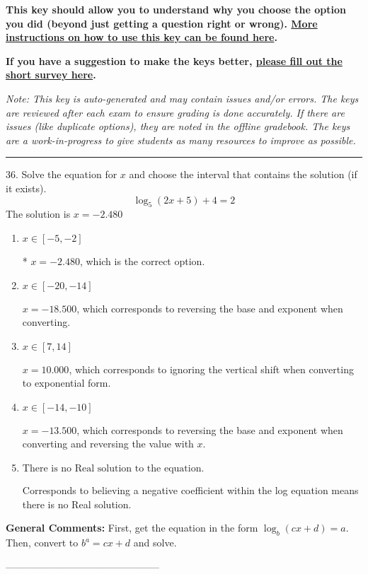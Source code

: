 \documentclass{extbook}[14pt]
\begin{document}
\textbf{This key should allow you to understand why you choose the option you did (beyond just getting a question right or wrong). \href{https://xronos.clas.ufl.edu/mac1105spring2020/courseDescriptionAndMisc/Exams/LearningFromResults}{More instructions on how to use this key can be found here}.}

\textbf{If you have a suggestion to make the keys better, \href{https://forms.gle/CZkbZmPbC9XALEE88}{please fill out the short survey here}.}

\textit{Note: This key is auto-generated and may contain issues and/or errors. The keys are reviewed after each exam to ensure grading is done accurately. If there are issues (like duplicate options), they are noted in the offline gradebook. The keys are a work-in-progress to give students as many resources to improve as possible.}

\rule{\textwidth}{0.4pt}

36. Solve the equation for $x$ and choose the interval that contains the solution (if it exists).
\[ \log_{5}{(2x+5)}+4 = 2 \] 
The solution is $ x = -2.480 $ 

\begin{enumerate}[label=\Alph*.] 
\item $ x \in [-5, -2] $ 

 * $x = -2.480$, which is the correct option. 
\item $ x \in [-20, -14] $ 

 $x = -18.500$, which corresponds to reversing the base and exponent when converting. 
\item $ x \in [7, 14] $ 

 $x = 10.000$, which corresponds to ignoring the vertical shift when converting to exponential form. 
\item $ x \in [-14, -10] $ 

 $x = -13.500$, which corresponds to reversing the base and exponent when converting and reversing the value with $x$. 
\item $ \text{There is no Real solution to the equation.} $ 

 Corresponds to believing a negative coefficient within the log equation means there is no Real solution. 
\end{enumerate} 
 
\textbf{General Comments:} First, get the equation in the form $\log_b{(cx+d)} = a$. Then, convert to $b^a = cx+d$ and solve.

-----------------------------------------------
\end{document}
